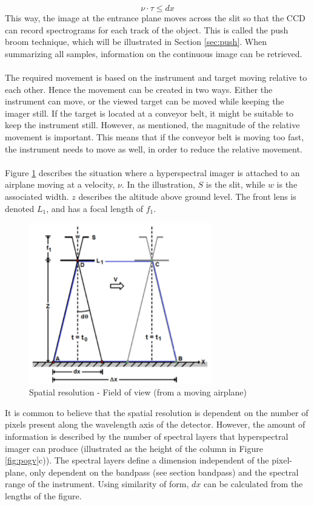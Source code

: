 \begin{equation}
    \nu \cdot \tau \leq dx
    \label{eq:req}
\end{equation}
This way, the image at the entrance plane moves across the slit so that the CCD can record spectrograms for each track of the object. This is called the push broom technique, which will be illustrated in Section \ref{sec:push}. When summarizing all samples, information on the continuous image can be retrieved.
\\\\
The required movement is based on the instrument and target moving relative to each other. Hence the movement can be created in two ways. Either the instrument can move, or the viewed target can be moved while keeping the imager still. If the target is located at a conveyor belt, it might be suitable to keep the instrument still. However, as mentioned, the magnitude of the relative movement is important. This means that if the conveyor belt is moving too fast, the instrument needs to move as well, in order to reduce the relative movement.
\\\\
Figure \ref{fig:spatialres} describes the situation where a hyperspectral imager is attached to an airplane moving at a velocity, $\nu$. In the illustration, $S$ is the slit, while $w$ is the associated width. $z$ describes the altitude above ground level. The front lens is denoted $L_1$, and has a focal length of $f_1$. 
\begin{figure}[H]
    \centering
    \includegraphics[height=7cm]{Images/theory/spatialres.png}
    \caption{Spatial resolution - Field of view (from a moving airplane)}
    \label{fig:spatialres}
\end{figure}
\noindent
It is common to believe that the spatial resolution is dependent on the number of pixels present along the wavelength axis of the detector. However, the amount of information is described by the number of spectral layers that hyperspectral imager can produce (illustrated as the height of the column in Figure \ref {fig:pogv}c)). The spectral layers define a dimension independent of the pixel-plane, only dependent on the bandpass (see section bandpass) and the spectral range of the instrument. Using similarity of form, $dx$ can be calculated from the lengths of the figure.
